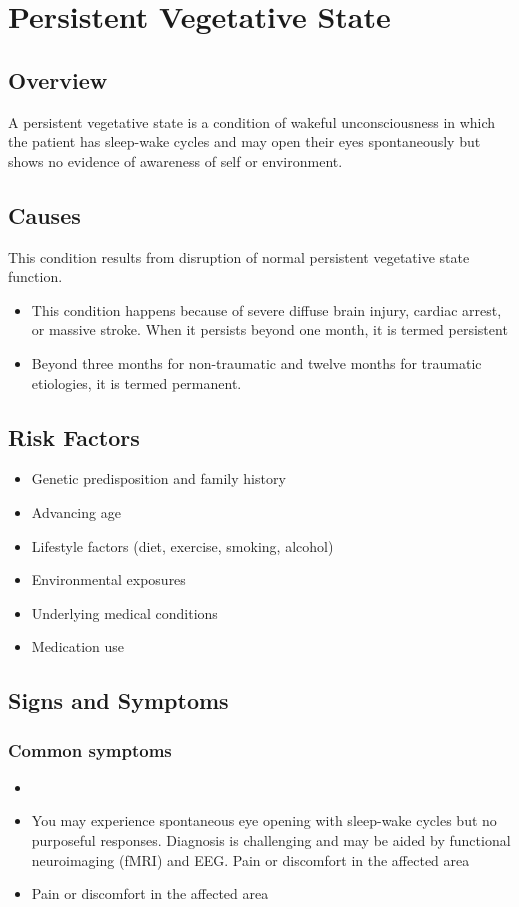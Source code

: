 \chapter{Persistent Vegetative State}
\label{sec:Persistent Vegetative State}

\section{Overview}
A persistent vegetative state is a condition of wakeful unconsciousness in which the patient has sleep-wake cycles and may open their eyes spontaneously but shows no evidence of awareness of self or environment.
\section{Causes}
This condition results from disruption of normal persistent vegetative state function.

\begin{itemize}[noitemsep]
  \item This condition happens because of severe diffuse brain injury, cardiac arrest, or massive stroke. When it persists beyond one month, it is termed persistent
  \item Beyond three months for non-traumatic and twelve months for traumatic etiologies, it is termed permanent.
\end{itemize}
\section{Risk Factors}


\begin{itemize}[noitemsep]
  \item Genetic predisposition and family history
  \item Advancing age
  \item Lifestyle factors (diet, exercise, smoking, alcohol)
  \item Environmental exposures
  \item Underlying medical conditions
  \item Medication use
\end{itemize}
\section{Signs and Symptoms}

\subsection{Common symptoms}
\begin{itemize}[noitemsep]
  \item \item You may experience spontaneous eye opening with sleep-wake cycles but no purposeful responses. Diagnosis is challenging and may be aided by functional neuroimaging (fMRI) and EEG. Pain or discomfort in the affected area    \item Pain or discomfort in the affected area
  \end{itemize}

